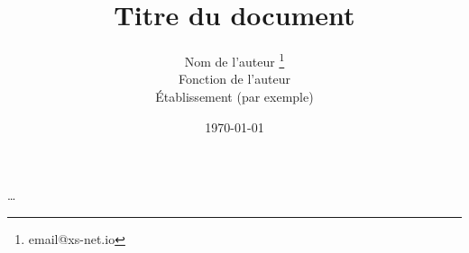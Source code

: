 \documentclass[french, 12pt, twoside, a4paper]{article}
\title{Titre du document}
\author{Nom de l'auteur \thanks{email@xs-net.io} \\
Fonction de l'auteur \\
Établissement (par exemple)}
\date{\today}
\begin{document}
\maketitle

…
\end{document}

